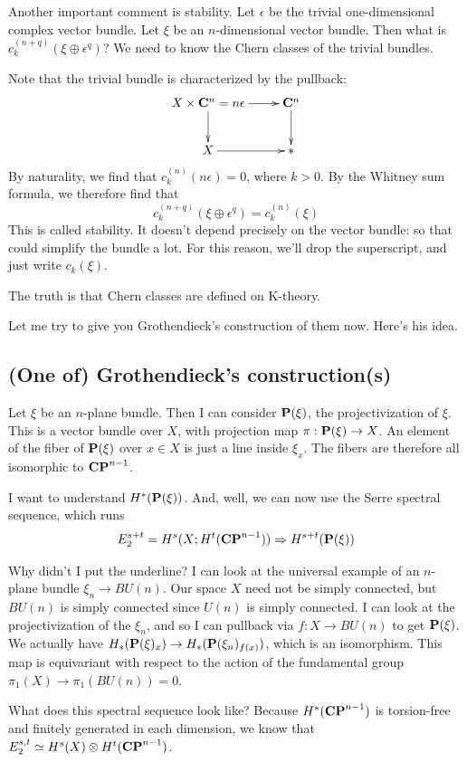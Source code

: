 Another important comment is stability.
Let $\epsilon$ be the trivial one-dimensional complex vector bundle.
Let $\xi$ be an $n$-dimensional vector bundle.
Then what is $c^{(n+q)}_k(\xi\oplus\epsilon^q)$?
We need to know the Chern classes of the trivial bundles.

Note that the trivial bundle is characterized by the pullback:
\begin{equation*}
    \xymatrix{
	X\times \cc^n = n\epsilon \ar[r]\ar[d] & \cc^n\ar[d]\\
	X\ar[r] & \ast
    }
\end{equation*}
By naturality, we find that $c^{(n)}_k(n\epsilon) = 0$, where $k>0$.
By the Whitney sum formula, we therefore find that
$$
c^{(n+q)}_k(\xi\oplus \epsilon^q) = c^{(n)}_k(\xi)
$$
This is called stability.
It doesn't depend precisely on the vector bundle: so that could simplify the bundle a lot.
For this reason, we'll drop the superscript, and just write $c_k(\xi)$.

The truth is that Chern classes are defined on K-theory.

Let me try to give you Grothendieck's construction of them now.
Here's his idea.
\subsection{(One of) Grothendieck's construction(s)}
Let $\xi$ be an $n$-plane bundle.
Then I can consider $\mathbf P(\xi)$, the projectivization of $\xi$.
This is a vector bundle over $X$, with projection map $\pi:\mathbf P(\xi) \to X$.
An element of the fiber of $\mathbf P(\xi)$ over $x\in X$ is just a line inside $\xi_x$.
The fibers are therefore all isomorphic to $\mathbf{CP}^{n-1}$.

I want to understand $H^\ast(\mathbf P(\xi))$.
And, well, we can now use the Serre spectral sequence, which runs
$$
E_2^{s+t} = H^s(X; H^t(\mathbf{CP}^{n-1})) \Rightarrow H^{s+t}(\mathbf P(\xi))
$$
\begin{remark}
Why didn't I put the underline?
I can look at the universal example of an $n$-plane bundle $\xi_n\to BU(n)$.
Our space $X$ need not be simply connected, but $BU(n)$ is simply connected since $U(n)$ is simply connected.
I can look at the projectivization of the $\xi_n$, and so I can pullback via $f:X\to BU(n)$ to get $\mathbf P(\xi)$.
We actually have $H_\ast(\mathbf P(\xi)_x) \to H_\ast(\mathbf P(\xi_n)_{f(x)})$, which is an isomorphism.
This map is equivariant with respect to the action of the fundamental group $\pi_1 (X) \to \pi_1(BU(n)) = 0$.
\end{remark}
What does this spectral sequence look like?
Because $H^\ast(\mathbf{CP}^{n-1})$ is torsion-free and finitely generated in each dimension, we know that $E_2^{s,t} \simeq H^s(X) \otimes H^t(\mathbf{CP}^{n-1})$.

